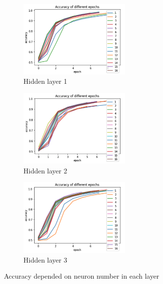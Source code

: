 \documentclass{article}
\begin{document}
\begin{figure}[htb]
\begin{subfigure}{.5\textwidth}
  \centering
  \includegraphics[width=5.5cm]{hidden1}
  \caption{Hidden layer 1}
  \label{fig: hidden1}
\end{subfigure}
\begin{subfigure}{.5\textwidth}
  \centering
  \includegraphics[width=5.5cm]{hidden2}
  \caption{Hidden layer 2}
  \label{fig:validation dataset}
\end{subfigure}
\begin{subfigure}{.5\textwidth}
  \centering
  \includegraphics[width=5.5cm]{hidden3}
  \caption{Hidden layer 3}
  \label{fig: hidden3}
\end{subfigure}
\caption{Accuracy depended on neuron number in each layer}
\label{fig:Accuracy  hidden}
\end{figure}
\FloatBarrier
\end{document}
